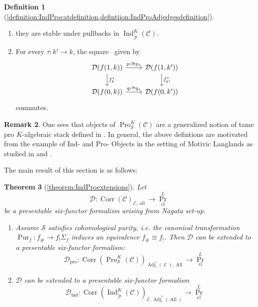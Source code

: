 \documentclass[14pt]{article}
\newtheorem{theorem}{Theorem}[subsection]
\theoremstyle{definition}
\newtheorem{definition}[theorem]{Definition}
\newtheorem{remark}[theorem]{Remark}
\newcommand{\E}{\mathcal{E}}
\newcommand{\D}{\mathcal{D}}
\renewcommand{\P}{\mathcal{P}}
\newcommand{\op}[1]{\operatorname{#1}}
\renewcommand{\S}{\mathcal{S}}
\newcommand{\Ca}{\mathcal{C}}
\numberwithin{subsection}{section}
\begin{document}
\begin{definition}[\cref{definition:IndProcatdefinition,defintiion:IndProAdjedgesdefinition}]
\begin{enumerate}
\begin{enumerate}
    \begin{enumerate}
    \item they are stable under pullbacks in $\op{Ind}^K_{\tilde{\P}}(\Ca)$.
    \item For every $\tau: k' \to k$, the square  \ given by
    \begin{equation}
    \begin{tikzcd}
        \D(f(1,k)) \arrow[r," p_! \cong p_*"] \arrow[d,"f_{k}^*"] & \D(f(1,k')) \arrow[d,"f_{k'}^*"]\\
        \D(f(0,k)) \arrow[r,"q_! \cong q_*"] & \D(f(0,k'))
        \end{tikzcd}
    \end{equation}
    commutes. 
    \end{enumerate}
    \end{enumerate}
    \end{enumerate}
    
\end{definition}
\begin{remark}
    One sees that objects of $\op{Pro}^K_{\S}(\Ca)$ are a generalized notion of tame pro $K$-algebraic stack defined  in  \cite{yaylali2025rationalmotivesproalgebraicstacks}. In general, the above defintions are motivated from the example of Ind- and Pro- Objects in the setting of Motivic Langlands as studied in \cite{richarzscholbachintersectionmotive} and \cite{zhu2025tamecategoricallocallanglands}.
\end{remark}


The main result of this section is as follows:

\begin{theorem}[\cref{theorem:IndProextensions}]\label{theorem:IntroIndProextension}
Let 
\begin{equation}
    \D : \op{Corr}(\Ca)_{\E,\op{all}} \to \op{Pr}^L_{\op{cl}}
\end{equation}
be a presentable six-functor formalism arising from Nagata set-up. 

\begin{enumerate}
    \item Assume $\S$ satisfies cohomological purity, i.e. the canonical transformation $\op{Pur}_f : f_{\#} \to f_!\Sigma_f$ induces an equivalence $f_{\#} \cong f_!$. Then $\D$ can be extended to a presentable six-functor formalism:
    \begin{equation}
        \D_{\op{pro}} : \op{Corr}(\op{Pro}^K_{\S}(\Ca))_{\op{Adj}^!_!(\op{\E}),\op{All}} \to \op{Pr}^L_{\op{cl}}
    \end{equation}
    \item $\D$ can be extended to a presentable six-functor formalism
    \begin{equation}
        \D_{\op{ind}}: \op{Corr}(\op{Ind}^K_{\tilde{\P}}(\Ca))_{\E,\op{Adj}^*_!(\op{All})} \to \op{Pr}^L_{\op{cl}}
    \end{equation}
\end{enumerate}
\end{theorem}
\end{document}
